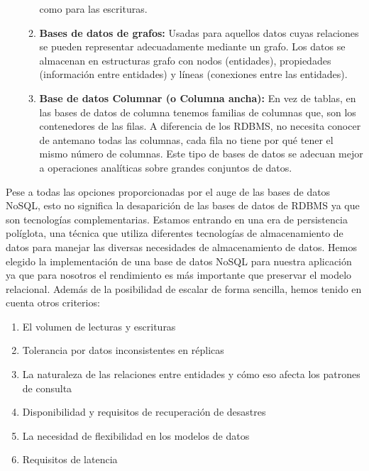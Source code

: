 \begin{enumerate}
\begin{enumerate}
 como para las escrituras. 
\item \textbf{Bases de datos de grafos:} Usadas para aquellos datos 
cuyas relaciones se pueden representar adecuadamente mediante 
un grafo. Los datos se almacenan en estructuras grafo con nodos 
(entidades), propiedades (información entre entidades) y líneas (conexiones
 entre las entidades). 
\item \textbf{Base de datos Columnar (o Columna ancha):} En vez de
 tablas, en las bases de datos de columna tenemos familias de columnas
 que, son los contenedores de las filas. A diferencia de los RDBMS, 
no necesita conocer de antemano todas las columnas, cada fila no tiene 
por qué tener el mismo número de columnas. Este tipo de bases de datos
 se adecuan mejor a operaciones analíticas sobre grandes conjuntos de datos.
\end{enumerate}

\end{enumerate}
Pese a todas las opciones proporcionadas por el auge de las bases
 de datos NoSQL, esto no significa la desaparición de las bases de 
datos de RDBMS ya que son tecnologías complementarias. Estamos
 entrando en una era de persistencia políglota, una técnica que utiliza 
diferentes tecnologías de almacenamiento de datos para manejar las 
diversas necesidades de almacenamiento de datos. Hemos elegido la 
implementación de una base de datos NoSQL para nuestra aplicación
 ya que para nosotros el rendimiento es más importante que preservar 
el modelo relacional. Además de la posibilidad de escalar de forma sencilla, 
hemos tenido en cuenta otros criterios: 
\begin{enumerate}
\item El volumen de lecturas y escrituras
\item Tolerancia por datos inconsistentes en réplicas
\item La naturaleza de las relaciones entre entidades y cómo eso afecta
 los patrones de consulta
\item Disponibilidad y requisitos de recuperación de desastres
\item La necesidad de flexibilidad en los modelos de datos
\item Requisitos de latencia
\end{enumerate}
